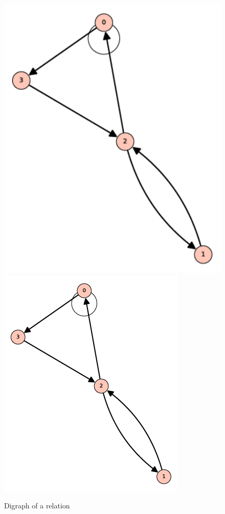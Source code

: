 \documentclass[10pt,]{book}
\theoremstyle{plain}
\theoremstyle{definition}
\theoremstyle{definition}
\theoremstyle{definition}
\theoremstyle{definition}
\begin{document}
\begin{figure}
\centering
{}%
{\includegraphics[width=1\linewidth]{images/graph-6-2-1.pdf}}%
{\includegraphics[width=1\linewidth]{images/graph-6-2-1.png}}
\caption{Digraph of a relation \label{fig-graph-6-2-1}}
\end{figure}
\end{document}
